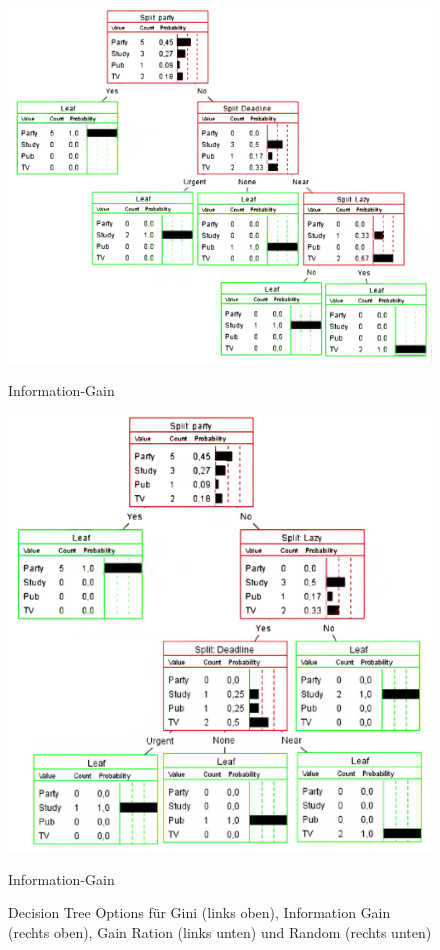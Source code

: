 \documentclass[a4paper,parskip=full-]{article}
\begin{document}
\begin{figure}[H]
	\begin{minipage}[b]{0.45\textwidth}
  		\centering
    	\includegraphics[width=\columnwidth]{3c-Gain-Ration}
    	\caption{Information-Gain}
    \end{minipage}
    \hfill
    \begin{minipage}[b]{0.45\textwidth}
  		\centering
    	\includegraphics[width=\columnwidth]{3c-Random}
    	\caption{Information-Gain}
    \end{minipage}
    \caption{Decision Tree Options für Gini (links oben), Information Gain (rechts oben), 
    Gain Ration (links unten) und Random (rechts unten)}
    \label{fig:3c}
\end{figure}
\end{document}

